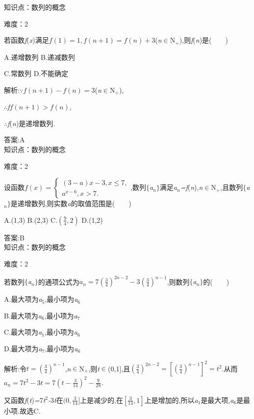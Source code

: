 \documentclass{article} %
\begin{document}
知识点：数列的概念

难度：2

 若函数\textit{f}(\textit{x})满足$f(1)=1,f(n+1)=f(n)+3$(\textit{n}$\mathrm{\in}$N\textit{${}_{+}$}),则\textit{f}(\textit{n})是(\textit{　　})

 A.递增数列 B.递减数列

 C.常数列 D.不能确定

 解析:\textit{$\because$}$f(n+1)-f(n)=3$(\textit{n}$\mathrm{\in}$N\textit{${}_{+}$}),

\textit{$\therefore$f}$f(n+1)>f(n)$,

\textit{$\therefore$f}(\textit{n})是递增数列\textit{.}

 答案:A \\

知识点：数列的概念

难度：2

 设函数$f(x)=\left\{
\begin{array}{l}
(3-a)x-3,x\le 7, \\
a^{x-6},x>7. 
\end{array}
\right.$,数列$\mathrm{\{}$\textit{a${}_{n}$}$\mathrm{\}}$满足\textit{a${}_{n}$=f}(\textit{n}),\textit{n}$\mathrm{\in}$N\textit{${}_{+}$},且数列$\mathrm{\{}$\textit{a${}_{n}$}$\mathrm{\}}$是递增数列,则实数\textit{a}的取值范围是(\textit{　　})

 A.(1,3) B.(2,3) C.$(\frac{9}{4},2)$ D.(1,2)

 答案:B \\

知识点：数列的概念

难度：2

 若数列$\mathrm{\{}$\textit{a${}_{n}$}$\mathrm{\}}$的通项公式为$a_n=7(\frac{3}{4})^{2n-2}-3(\frac{3}{4})^{n-1}$,则数列$\mathrm{\{}$\textit{a${}_{n}$}$\mathrm{\}}$的(\textit{　　})

 A.最大项为\textit{a}${}_{5}$,最小项为\textit{a}${}_{6}$

 B.最大项为\textit{a}${}_{6}$,最小项为\textit{a}${}_{7}$

 C.最大项为\textit{a}${}_{1}$,最小项为\textit{a}${}_{6}$

 D.最大项为\textit{a}${}_{7}$,最小项为\textit{a}${}_{6}$

 解析:令$t=(\frac{3}{4})^{n-1}$,\textit{n}$\mathrm{\in}$N\textit{${}_{+}$},则\textit{t}$\mathrm{\in}$(0,1],且$(\frac{3}{4})^{2n-2}=[(\frac{3}{4})^{n-1}]^2=t^2$.从而$a_n = 7t^2-3t=7(t-\frac{3}{14})^2-\frac{9}{28}$.

又函数\textit{f}(\textit{t})\textit{=}7\textit{t}${}^{2}$\textit{-}3\textit{t}在$(0,\frac{3}{14}]$上是减少的,在$[\frac{3}{14},1]$上是增加的,所以\textit{a}${}_{1}$是最大项,\textit{a}${}_{6}$是最小项\textit{.}故选C\textit{.}
\end{document}
